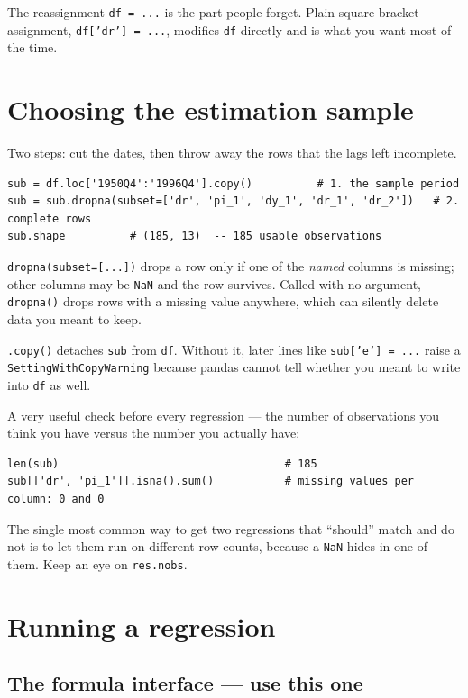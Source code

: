 \documentclass[11pt]{article}
\newcommand{\code}[1]{\texttt{#1}}
\begin{document}
\noindent The reassignment \code{df = ...} is the part people forget. Plain
square-bracket assignment, \code{df['dr'] = ...}, modifies \code{df} directly and
is what you want most of the time.

\section{Choosing the estimation sample}

Two steps: cut the dates, then throw away the rows that the lags left incomplete.

\begin{lstlisting}
sub = df.loc['1950Q4':'1996Q4'].copy()          # 1. the sample period
sub = sub.dropna(subset=['dr', 'pi_1', 'dy_1', 'dr_1', 'dr_2'])   # 2. complete rows
sub.shape          # (185, 13)  -- 185 usable observations
\end{lstlisting}

\noindent\code{dropna(subset=[...])} drops a row only if one of the \emph{named}
columns is missing; other columns may be \code{NaN} and the row survives. Called
with no argument, \code{dropna()} drops rows with a missing value anywhere, which
can silently delete data you meant to keep.

\noindent\code{.copy()} detaches \code{sub} from \code{df}. Without it, later lines
like \code{sub['e'] = ...} raise a \code{SettingWithCopyWarning} because pandas
cannot tell whether you meant to write into \code{df} as well.

\noindent A very useful check before every regression --- the number of
observations you think you have versus the number you actually have:

\begin{lstlisting}
len(sub)                                   # 185
sub[['dr', 'pi_1']].isna().sum()           # missing values per column: 0 and 0
\end{lstlisting}

\noindent The single most common way to get two regressions that ``should''
match and do not is to let them run on different row counts, because a
\code{NaN} hides in one of them. Keep an eye on \code{res.nobs}.

\section{Running a regression}

\subsection{The formula interface --- use this one}
\end{document}
